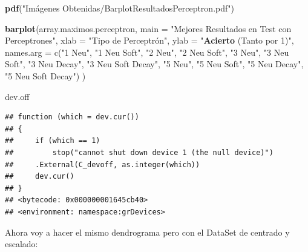 \documentclass[]{article}
\newenvironment{Shaded}{\begin{snugshade}}{\end{snugshade}}
\newcommand{\DataTypeTok}[1]{\textcolor[rgb]{0.13,0.29,0.53}{#1}}
\newcommand{\DecValTok}[1]{\textcolor[rgb]{0.00,0.00,0.81}{#1}}
\newcommand{\KeywordTok}[1]{\textcolor[rgb]{0.13,0.29,0.53}{\textbf{#1}}}
\newcommand{\NormalTok}[1]{#1}
\newcommand{\StringTok}[1]{\textcolor[rgb]{0.31,0.60,0.02}{#1}}
\begin{document}
\begin{Shaded}
\begin{Highlighting}[]
\KeywordTok{pdf}\NormalTok{(}\StringTok{"Imágenes Obtenidas/BarplotResultadosPerceptron.pdf"}\NormalTok{)}

\KeywordTok{barplot}\NormalTok{(array.maximos.perceptron,}
        \DataTypeTok{main =} \StringTok{"Mejores Resultados en Test con Perceptrones"}\NormalTok{,}
        \DataTypeTok{xlab =} \StringTok{"Tipo de Perceptrón",}
\StringTok{        ylab = "}\KeywordTok{Acierto}\NormalTok{ (Tanto por }\DecValTok{1}\NormalTok{)}\StringTok{",}
\StringTok{        names.arg = c("}\DecValTok{1}\NormalTok{ Neu}\StringTok{", "}\DecValTok{1}\NormalTok{ Neu Soft}\StringTok{", }
\StringTok{                      "}\DecValTok{2}\NormalTok{ Neu}\StringTok{", "}\DecValTok{2}\NormalTok{ Neu Soft}\StringTok{", }
\StringTok{                      "}\DecValTok{3}\NormalTok{ Neu}\StringTok{", "}\DecValTok{3}\NormalTok{ Neu Soft}\StringTok{", "}\DecValTok{3}\NormalTok{ Neu Decay}\StringTok{", "}\DecValTok{3}\NormalTok{ Neu Soft Decay}\StringTok{", }
\StringTok{                      "}\DecValTok{5}\NormalTok{ Neu}\StringTok{", "}\DecValTok{5}\NormalTok{ Neu Soft}\StringTok{", "}\DecValTok{5}\NormalTok{ Neu Decay}\StringTok{", "}\DecValTok{5}\NormalTok{ Neu Soft Decay}\StringTok{")}
\StringTok{      )}

\StringTok{dev.off}
\end{Highlighting}
\end{Shaded}

\begin{verbatim}
## function (which = dev.cur()) 
## {
##     if (which == 1) 
##         stop("cannot shut down device 1 (the null device)")
##     .External(C_devoff, as.integer(which))
##     dev.cur()
## }
## <bytecode: 0x000000001645cb40>
## <environment: namespace:grDevices>
\end{verbatim}

Ahora voy a hacer el mismo dendrograma pero con el DataSet de centrado y
escalado:
\end{document}
